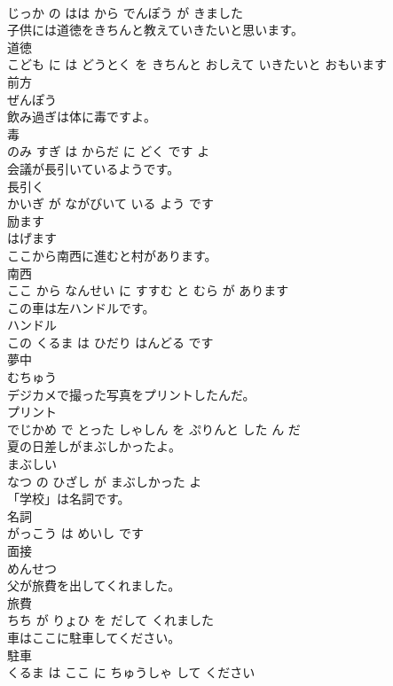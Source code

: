 \documentclass[8pt]{extreport}
\begin{document}
\begin{CJK}{UTF8}{min}
\\	じっか の はは から でんぽう が きました			
\\	子供には道徳をきちんと教えていきたいと思います。	
\\	道徳 
\\	こども に は どうとく を きちんと おしえて いきたいと おもいます			
\\	前方	
\\	ぜんぽう		
\\	飲み過ぎは体に毒ですよ。	
\\	毒 
\\	のみ すぎ は からだ に どく です よ			
\\	会議が長引いているようです。	
\\	長引く 
\\	かいぎ が ながびいて いる よう です			
\\	励ます	
\\	はげます		
\\	ここから南西に進むと村があります。	
\\	南西 
\\	ここ から なんせい に すすむ と むら が あります			
\\	この車は左ハンドルです。	
\\	ハンドル 
\\	この くるま は ひだり はんどる です			
\\	夢中	
\\	むちゅう		
\\	デジカメで撮った写真をプリントしたんだ。	
\\	プリント 
\\	でじかめ で とった しゃしん を ぷりんと した ん だ			
\\	夏の日差しがまぶしかったよ。	
\\	まぶしい 
\\	なつ の ひざし が まぶしかった よ			
\\	「学校」は名詞です。	
\\	名詞 
\\	がっこう は めいし です			
\\	面接	
\\	めんせつ		
\\	父が旅費を出してくれました。	
\\	旅費 
\\	ちち が りょひ を だして くれました			
\\	車はここに駐車してください。	
\\	駐車 
\\	くるま は ここ に ちゅうしゃ して ください			

\end{CJK}
\end{document}
